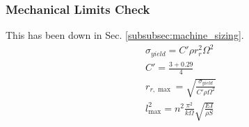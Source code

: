 \documentclass[]{interact}
\begin{document}
\subsubsection{Mechanical Limits Check}
This has been down in Sec. \ref{subsubsec:machine_sizing}.
\[\begin{array}{l}
{\sigma _{yield}} = C'\rho r_r^2{\Omega ^2}\\
C' = \frac{{3 + 0.29}}{4}\\
{r_{r,\max }} = \sqrt {\frac{{{\sigma _{yield}}}}{{C'\rho {\Omega ^2}}}} \\
l_{\max }^2 = {n^2}\frac{{{\pi ^2}}}{{k\Omega }}\sqrt {\frac{{EI}}{{\rho S}}}
\end{array}\]


%
\end{document}
